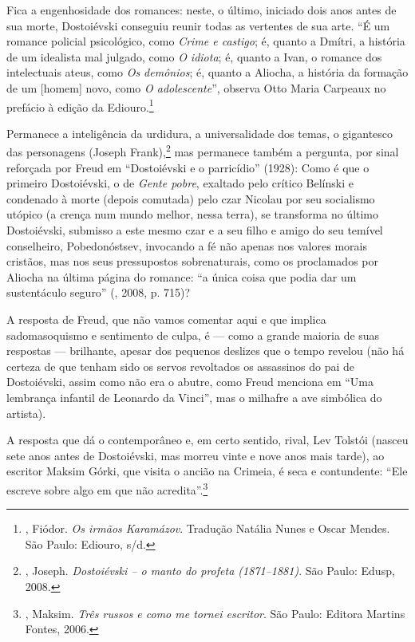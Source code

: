 Fica a engenhosidade dos romances: neste, o último, iniciado dois anos antes de sua morte, Dostoiévski conseguiu reunir todas as vertentes de sua arte. ``É um romance policial psicológico, como \emph{Crime e castigo}; é, quanto a Dmítri, a história de um idealista mal julgado, como \emph{O idiota}; é, quanto a Ivan, o romance dos intelectuais ateus, como \emph{Os demônios}; é, quanto a Aliocha, a história da formação de um [homem] novo, como \emph{O adolescente}'', observa Otto Maria Carpeaux no prefácio à edição da Ediouro.\footnote{, Fiódor. \emph{Os irmãos Karamázov}. Tradução Natália Nunes e Oscar Mendes. São Paulo: Ediouro, s/d.}

Permanece a inteligência da urdidura, a universalidade dos temas, o gigantesco das personagens (Joseph Frank),\footnote{, Joseph. \emph{Dostoiévski -- o manto do profeta (1871--1881)}. São Paulo: Edusp, 2008.} mas permanece também a pergunta, por sinal reforçada por Freud em ``Dostoiévski e o parricídio'' (1928): Como é que o primeiro Dostoiévski, o de \emph{Gente pobre}, exaltado pelo crítico Belínski e condenado à morte (depois comutada) pelo czar Nicolau  por seu socialismo utópico (a crença num mundo melhor, nessa terra), se transforma no último Dostoiévski, submisso a este mesmo czar e a seu filho e amigo do seu temível conselheiro, Pobedonóstsev, invocando a fé não apenas nos valores morais cristãos, mas nos seus pressupostos
sobrenaturais, como os proclamados por Aliocha na última página do romance: ``a única coisa que podia dar um sustentáculo seguro'' (, 2008, p. 715)?

A resposta de Freud, que não vamos comentar aqui e que implica sadomasoquismo e sentimento de culpa, é --- como a grande maioria de suas respostas --- brilhante, apesar dos pequenos deslizes que o tempo revelou (não há certeza de que tenham sido os servos revoltados os assassinos do pai de Dostoiévski, assim como não era o abutre, como Freud menciona em ``Uma lembrança infantil de Leonardo da Vinci'', mas o milhafre a ave simbólica do artista).

A resposta que dá o contemporâneo e, em certo sentido, rival, Lev Tolstói (nasceu sete anos antes de Dostoiévski, mas morreu vinte e nove anos mais tarde), ao escritor Maksim Górki, que visita o ancião na Crimeia, é seca e contundente: ``Ele escreve sobre algo em que não acredita''.\footnote{, Maksim. \emph{Três russos e como me tornei escritor}. São Paulo: Editora Martins Fontes, 2006.}

